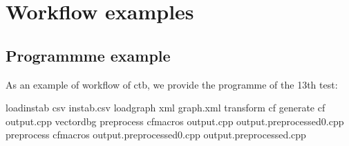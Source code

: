 
\section{Workflow examples}

\subsection*{Programmme example}

As an example of workflow of ctb, we provide the programme of the 13th test:

\mybeginfig
\begin{code}
loadinstab csv instab.csv
loadgraph xml graph.xml
transform cf
generate cf output.cpp vectordbg
preprocess cfmacros output.cpp output.preprocessed0.cpp
preprocess cfmacros output.preprocessed0.cpp output.preprocessed.cpp
\end{code}

